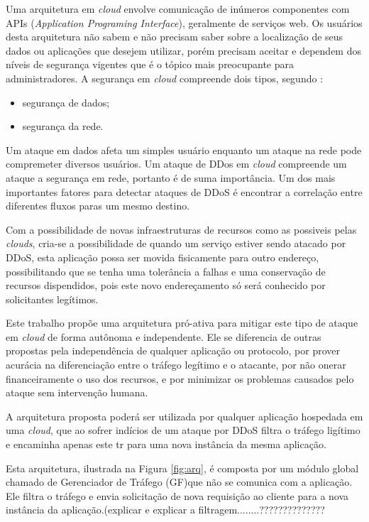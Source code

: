 \documentclass[a4paper, 12pt]{article}
\begin{document}
Uma arquitetura em \emph{cloud} envolve comunicação de inúmeros componentes com APIs (\emph{Application Programing Interface}), geralmente de serviços web. Os usuários desta arquitetura não sabem e não precisam saber sobre a localização de seus dados ou aplicações que desejem utilizar, porém precisam aceitar e dependem  dos níveis de segurança vigentes que é o tópico mais preocupante para administradores.
A segurança em \emph{cloud} compreende dois tipos, segundo \cite{Dhage:2011:IDS:1980022.1980076}:  
\begin{itemize}
\item segurança de dados;
\item segurança da rede.
\end{itemize}

Um ataque em dados afeta um simples usuário enquanto um ataque na rede pode compremeter diversos usuários. Um ataque de DDos em \emph{cloud} compreende um ataque a segurança em rede, portanto é de suma importância. 
Um dos mais importantes fatores para detectar ataques de DDoS é encontrar a correlação entre diferentes fluxos paras um mesmo destino.

Com a possibilidade de novas infraestruturas de recursos como as possiveis pelas \emph{clouds}, cria-se a possibilidade de quando um serviço estiver sendo atacado por DDoS, esta aplicação possa ser movida fisicamente para outro endereço, possibilitando que se tenha uma tolerância a falhas e uma conservação de recursos dispendidos, pois este novo endereçamento só será conhecido por solicitantes legítimos.

Este trabalho propõe uma arquitetura pró-ativa para mitigar este tipo de ataque em \emph{cloud} de forma autônoma e independente. Ele se diferencia de outras propostas pela independência de qualquer aplicação ou protocolo, por prover acurácia na diferenciação entre o tráfego legítimo e o atacante, por não onerar financeiramente o uso dos recursos, e por minimizar os problemas causados pelo ataque sem intervenção humana.

A arquitetura proposta poderá ser utilizada por qualquer aplicação hospedada em uma \emph{cloud}, que ao sofrer indícios de um ataque por DDoS filtra o tráfego ligítimo e encaminha apenas este tr para uma nova instância da mesma aplicação. 

Esta arquitetura, ilustrada na Figura \ref{fig:arq}, é composta por um módulo global chamado de Gerenciador de Tráfego (GF)que não se comunica com a aplicação. Ele filtra o tráfego e envia solicitação de  nova requisição ao cliente para a nova instância da aplicação.(explicar e explicar a filtragem........?????????????? 
\end{document}
